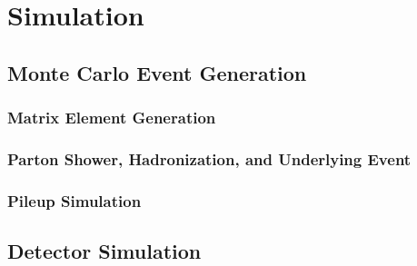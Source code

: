 
\chapter{Simulation}\label{ch:simulation}

\section{Monte Carlo Event Generation}


\subsection{Matrix Element Generation}



\subsection{Parton Shower, Hadronization, and Underlying Event}\label{sec:partonShower}



\subsection{Pileup Simulation}




\section{Detector Simulation}
